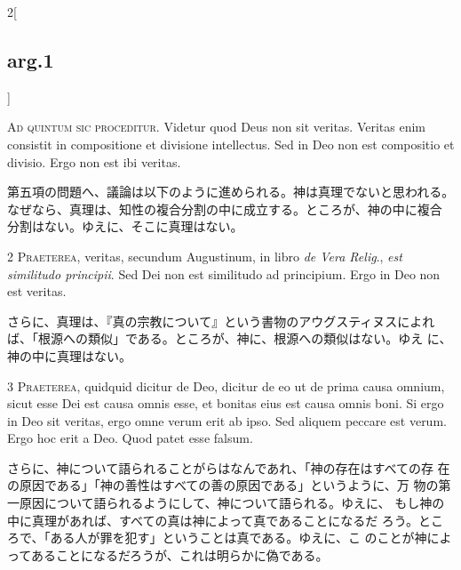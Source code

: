 \documentclass[paper=a4paper,fontsize=10pt,jafontsize=9pt,titlepage]{jlreq}
\begin{document}
\begin{paracol}{2}[\subsection{arg.1}]


{\huge A}{\scshape d quintum sic proceditur}. Videtur quod Deus non
 sit veritas. Veritas enim consistit in compositione et divisione
 intellectus. Sed in Deo non est compositio et divisio. Ergo non est
 ibi veritas.

\switchcolumn

第五項の問題へ、議論は以下のように進められる。神は真理でないと思われる。
なぜなら、真理は、知性の複合分割の中に成立する。ところが、神の中に複合
分割はない。ゆえに、そこに真理はない。



{\scshape 2 Praeterea}, veritas, secundum Augustinum, in libro
 {\itshape de Vera Relig}., {\itshape est similitudo principii}. Sed
 Dei non est similitudo ad principium. Ergo in Deo non est veritas.

\switchcolumn

さらに、真理は、『真の宗教について』という書物のアウグスティヌスによれ
 ば、「根源への類似」である。ところが、神に、根源への類似はない。ゆえ
 に、神の中に真理はない。



{\scshape 3 Praeterea}, quidquid dicitur de Deo, dicitur de eo ut de
 prima causa omnium, sicut esse Dei est causa omnis esse, et bonitas
 eius est causa omnis boni. Si ergo in Deo sit veritas, ergo omne
 verum erit ab ipso. Sed aliquem peccare est verum. Ergo hoc erit a
 Deo. Quod patet esse falsum.

\switchcolumn

さらに、神について語られることがらはなんであれ、「神の存在はすべての存
 在の原因である」「神の善性はすべての善の原因である」というように、万
 物の第一原因について語られるようにして、神について語られる。ゆえに、
 もし神の中に真理があれば、すべての真は神によって真であることになるだ
 ろう。ところで、「ある人が罪を犯す」ということは真である。ゆえに、こ
 のことが神によってあることになるだろうが、これは明らかに偽である。


\end{paracol}
\end{document}
